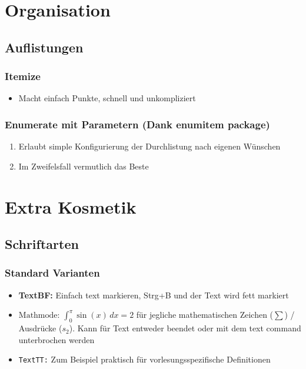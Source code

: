 \documentclass{scrartcl}
\author{\myauthor}
\title{\mytitle}
\subtitle{\mysubtitle}
\begin{document}

\maketitle
\thispagestyle{empty} %
\tableofcontents  %
\thispagestyle{empty} %
\newpage
\setcounter{page}{1}

\section{Organisation}
\subsection{Auflistungen}
\subsubsection{Itemize}
\begin{itemize}
    \item Macht einfach Punkte, schnell und unkompliziert
\end{itemize}
\subsubsection{Enumerate mit Parametern (Dank enumitem package)}
\begin{enumerate}[label=\alph*)]
    \item Erlaubt simple Konfigurierung der Durchlistung nach eigenen Wünschen
    \item Im Zweifelsfall vermutlich das Beste
\end{enumerate}

\section{Extra Kosmetik}
\subsection{Schriftarten}
\subsubsection{Standard Varianten}
\begin{itemize}
    \item \textbf{TextBF:} Einfach text markieren, Strg+B und der Text wird fett markiert
    \item $\text{Mathmode: } \int_{0}^{\pi} \sin(x) \, dx = 2$ für jegliche mathematischen Zeichen ($\sum$) / Ausdrücke ($s_2$). Kann für Text entweder beendet oder mit dem text command unterbrochen werden
    \item \texttt{TextTT:} Zum Beispiel praktisch für vorlesungsspezifische Definitionen
\end{itemize}
\end{document}
